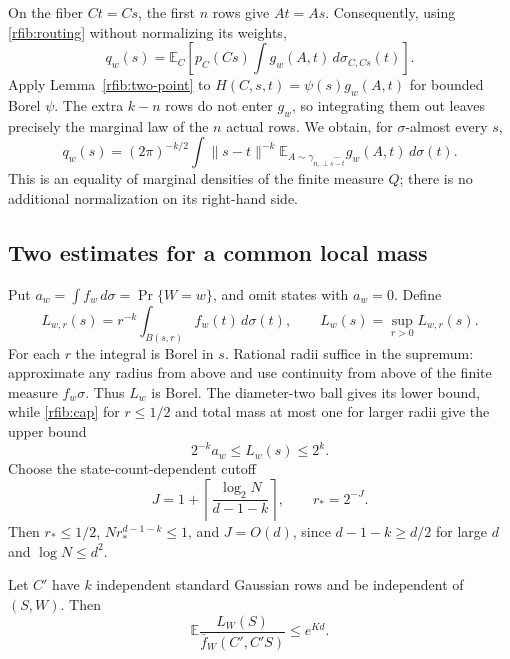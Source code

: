 On the fiber \(Ct=Cs\), the first \(n\) rows give \(At=As\).
Consequently, using \eqref{rfib:routing} without normalizing its
weights,
\[
 q_w(s)=\mathbb E_C\left[
   p_C(Cs)\int g_w(A,t)\,d\sigma_{C,Cs}(t)\right].
\]
Apply Lemma~\ref{rfib:two-point} to
\(H(C,s,t)=\psi(s)g_w(A,t)\) for bounded Borel \(\psi\).
The extra \(k-n\) rows do not enter \(g_w\), so integrating them out
leaves precisely the marginal law of the \(n\) actual rows.  We obtain,
for \(\sigma\)-almost every \(s\),
\begin{equation}\label{rfib:kernel}
 q_w(s)=(2\pi)^{-k/2}\int
   \|s-t\|^{-k}
   \mathbb E_{A\sim\gamma_{n,\perp\widehat{s-t}}}g_w(A,t)
   \,d\sigma(t).
\end{equation}
This is an equality of marginal densities of the finite measure \(Q\);
there is no additional normalization on its right-hand side.

\subsection{Two estimates for a common local mass}

Put \(a_w=\int f_w\,d\sigma=\Pr\{W=w\}\), and omit states with
\(a_w=0\).  Define
\begin{equation}\label{rfib:local-mass}
 L_{w,r}(s)=r^{-k}\int_{B(s,r)}f_w(t)\,d\sigma(t),
 \qquad L_w(s)=\sup_{r>0}L_{w,r}(s).
\end{equation}
For each \(r\) the integral is Borel in \(s\).  Rational radii suffice
in the supremum: approximate any radius from above and use continuity
from above of the finite measure \(f_w\sigma\).  Thus \(L_w\) is
Borel.  The diameter-two ball gives its lower bound, while
\eqref{rfib:cap} for \(r\le1/2\) and total mass at most one for larger
radii give the upper bound
\begin{equation}\label{rfib:local-bounds}
 2^{-k}a_w\le L_w(s)\le2^k .
\end{equation}
Choose the state-count-dependent cutoff
\begin{equation}\label{rfib:cutoff}
 J=1+\left\lceil\frac{\log_2N}{d-1-k}\right\rceil,\qquad
 r_*=2^{-J}.
\end{equation}
Then \(r_*\le1/2\), \(Nr_*^{d-1-k}\le1\), and \(J=O(d)\), since
\(d-1-k\ge d/2\) for large \(d\) and \(\log N\le d^2\).

\begin{lemma}\label{rfib:first-ratio}
Let \(C'\) have \(k\) independent standard Gaussian rows and be
independent of \((S,W)\).  Then
\begin{equation}\label{rfib:ratio-fresh}
 \mathbb E\frac{L_W(S)}{\bar f_W(C',C'S)}\le e^{Kd}.
\end{equation}
\end{lemma}

